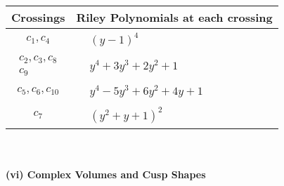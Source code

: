 \documentclass[1p]{elsarticle_modified}
\theoremstyle{definition}
\begin{document}
\begin{tabular}{m{50pt}|m{274pt}}
Crossings & \hspace{64pt}Riley Polynomials at each crossing \\
\hline $$\begin{aligned}c_{1},c_{4}\end{aligned}$$&$\begin{aligned}
&(y-1)^4
\end{aligned}$\\
\hline $$\begin{aligned}c_{2},c_{3},c_{8}\\c_{9}\end{aligned}$$&$\begin{aligned}
&y^4+3 y^3+2 y^2+1
\end{aligned}$\\
\hline $$\begin{aligned}c_{5},c_{6},c_{10}\end{aligned}$$&$\begin{aligned}
&y^4-5 y^3+6 y^2+4 y+1
\end{aligned}$\\
\hline $$\begin{aligned}c_{7}\end{aligned}$$&$\begin{aligned}
&(y^2+y+1)^2
\end{aligned}$\\
\hline
\end{tabular}\\~\\
\newpage\flushleft \textbf{(vi) Complex Volumes and Cusp Shapes}
\end{document}
